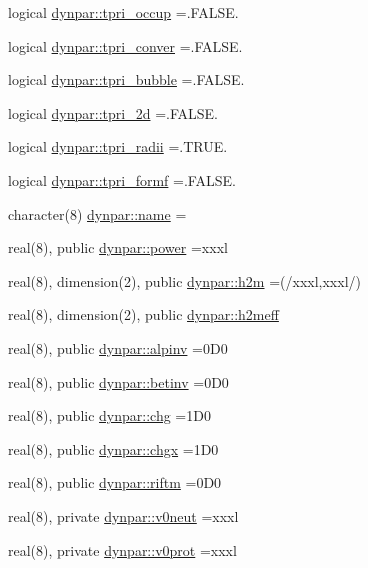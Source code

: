 \begin{DoxyCompactItemize}
logical \hyperlink{namespacedynpar_a2f991da94ce72ea9621829c805eb88c8}{dynpar\+::tpri\+\_\+occup} =.F\+A\+L\+S\+E.
\item 
logical \hyperlink{namespacedynpar_a96bc04198ad8726fd16f53a6f61c2f7a}{dynpar\+::tpri\+\_\+conver} =.F\+A\+L\+S\+E.
\item 
logical \hyperlink{namespacedynpar_aa0043c33177eb376646420545d40b387}{dynpar\+::tpri\+\_\+bubble} =.F\+A\+L\+S\+E.
\item 
logical \hyperlink{namespacedynpar_a07923fcee00bb618e690f652ec5ba62b}{dynpar\+::tpri\+\_\+2d} =.F\+A\+L\+S\+E.
\item 
logical \hyperlink{namespacedynpar_a6e3c31345887781dcf51743c54942fdd}{dynpar\+::tpri\+\_\+radii} =.T\+R\+U\+E.
\item 
logical \hyperlink{namespacedynpar_a588c8d0002ec334ca2215ec00c6f3724}{dynpar\+::tpri\+\_\+formf} =.F\+A\+L\+S\+E.
\item 
character(8) \hyperlink{namespacedynpar_a83d064b3d6c076b1252ddd73abe88d54}{dynpar\+::name} =\textquotesingle{}\textquotesingle{}
\item 
real(8), public \hyperlink{namespacedynpar_a275f6e0333127ac2efd1cb81989daf41}{dynpar\+::power} =xxxl
\item 
real(8), dimension(2), public \hyperlink{namespacedynpar_a78acc8d97e315a306429696f781455ad}{dynpar\+::h2m} =(/xxxl,xxxl/)
\item 
real(8), dimension(2), public \hyperlink{namespacedynpar_a204c595b7c821e702706ea2aeaa073f6}{dynpar\+::h2meff}
\item 
real(8), public \hyperlink{namespacedynpar_afc4b5b27793095c01311c4d69c9c6642}{dynpar\+::alpinv} =0\+D0
\item 
real(8), public \hyperlink{namespacedynpar_a67124410de445b1ff3dc681668a39f0c}{dynpar\+::betinv} =0\+D0
\item 
real(8), public \hyperlink{namespacedynpar_a8b133f1921af7be7f2564e2a60e693f0}{dynpar\+::chg} =1\+D0
\item 
real(8), public \hyperlink{namespacedynpar_a7b67156cd9a853a9e1b081318599d47a}{dynpar\+::chgx} =1\+D0
\item 
real(8), public \hyperlink{namespacedynpar_adeb7487b44f19e9008cc8b3475503559}{dynpar\+::riftm} =0\+D0
\item 
real(8), private \hyperlink{namespacedynpar_a656bd2f9ddcf1d701af02645567c4038}{dynpar\+::v0neut} =xxxl
\item 
real(8), private \hyperlink{namespacedynpar_a2b76f1e73803ee77254ad356dd9054d4}{dynpar\+::v0prot} =xxxl

\end{DoxyCompactItemize}
